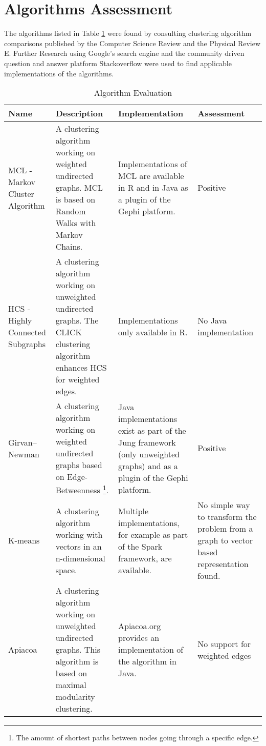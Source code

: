 \section{Algorithms Assessment}

The algorithms listed in Table \ref{tab:algorithmEvaluation} were found by consulting clustering algorithm comparisons published by the Computer Science Review\cite{schaeffer2007graph} and the Physical Review E\cite{lancichinetti2009community}. Further Research using Google's search engine and the community driven question and answer platform Stackoverflow\cite{stackoverflowGraphClustering} were used to find applicable implementations of the algorithms. 

\begin{table}[H]
	\centering
	\caption{Algorithm Evaluation}
	\label{tab:algorithmEvaluation}
	\begin{tabular}{|p{60pt}|p{140pt}|p{130pt}|p{70pt}|}
		\hline	
		\textbf{Name} & \textbf{Description} & \textbf{Implementation} & \textbf{Assessment} \\ 
		\hline
		MCL - Markov Cluster Algorithm\cite{markovCluster} & A clustering algorithm working on weighted undirected graphs. MCL is based on Random Walks with Markov Chains. & Implementations of MCL are available in R and in Java as a plugin of the Gephi\cite{gephi} platform. & Positive \\
		\hline
		HCS - Highly Connected Subgraphs\cite{hcs} & A clustering algorithm working on unweighted undirected graphs. The CLICK clustering algorithm enhances HCS for weighted edges. & Implementations only available in R. & No Java implementation  \\
		\hline
		Girvan–\newline Newman\cite{girvan} & A clustering algorithm working on weighted undirected graphs based on Edge-Betweenness \footnote{The amount of shortest paths between nodes going through a specific edge.}. & Java implementations exist as part of the Jung\cite{jung} framework (only unweighted graphs) and as a plugin\cite{girvanGephi} of the Gephi\cite{gephi} platform. & Positive \\
		\hline	
		K-means\cite{kmeans} & A clustering algorithm working with vectors in an n-dimensional space. & Multiple implementations, for example as part of the Spark\cite{spark} framework, are available. & No simple way to transform the problem from a graph to vector based representation found. \\
		\hline
		Apiacoa\cite{apiacoa} & A clustering algorithm working on unweighted undirected graphs. This algorithm is based on maximal modularity clustering. & Apiacoa.org provides an implementation of the algorithm in Java. & No support for weighted edges\\

\end{tabular}
\end{table}
